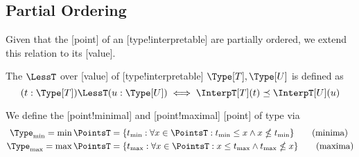 \subsection{Partial Ordering}

Given that the [point] of an [type!interpretable] are partially ordered, we extend this relation to its [value].

\begin{definition}
    The  \(\LessT\) over [value] of [type!interpretable] \(\Type[T], \Type[U]\) is defined as
    \begin{equation*}
        (t : \Type[T]) \LessT (u : \Type[U]) \iff \InterpT[T](t) \preceq \InterpT[U](u)
    \end{equation*}
\end{definition}

We define the [point!minimal] and [point!maximal] [point] of type \Type{} via
\begin{align}
    \Type_{\min} = \min \PointsT &= \{t_{\min} : \forall x \in \PointsT : t_{\min} \leq x \land x \nleq t_{\min}\}\tag{minima}\label{eq:minima} \\
    \Type_{\max} = \max \PointsT &= \{t_{\max} : \forall x \in \PointsT : x \leq t_{\max} \land t_{\max} \nleq x\}\tag{maxima}\label{eq:maxima}
\end{align}
